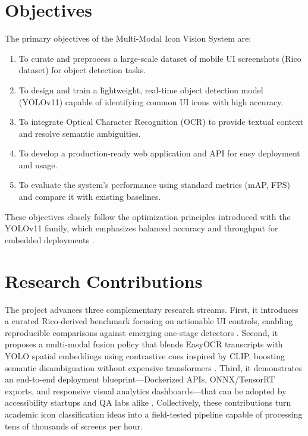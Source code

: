 \documentclass[11pt,a4paper]{report}
\begin{document}
\section{Objectives}
The primary objectives of the Multi-Modal Icon Vision System are:
\begin{enumerate}
    \item To curate and preprocess a large-scale dataset of mobile UI screenshots (Rico dataset) for object detection tasks.
    \item To design and train a lightweight, real-time object detection model (YOLOv11) capable of identifying common UI icons with high accuracy.
    \item To integrate Optical Character Recognition (OCR) to provide textual context and resolve semantic ambiguities.
    \item To develop a production-ready web application and API for easy deployment and usage.
    \item To evaluate the system's performance using standard metrics (mAP, FPS) and compare it with existing baselines.
\end{enumerate}
These objectives closely follow the optimization principles introduced with the YOLOv11 family, which emphasizes balanced accuracy and throughput for embedded deployments \cite{yolov11}.

\section{Research Contributions}
The project advances three complementary research streams. First, it introduces a curated Rico-derived benchmark focusing on actionable UI controls, enabling reproducible comparisons against emerging one-stage detectors \cite{rico}\cite{yolov8}. Second, it proposes a multi-modal fusion policy that blends EasyOCR transcripts with YOLO spatial embeddings using contrastive cues inspired by CLIP, boosting semantic disambiguation without expensive transformers \cite{clip}\cite{easyocr}. Third, it demonstrates an end-to-end deployment blueprint---Dockerized APIs, ONNX/TensorRT exports, and responsive visual analytics dashboards---that can be adopted by accessibility startups and QA labs alike \cite{docker}\cite{yolov11}. Collectively, these contributions turn academic icon classification ideas into a field-tested pipeline capable of processing tens of thousands of screens per hour.
\end{document}
